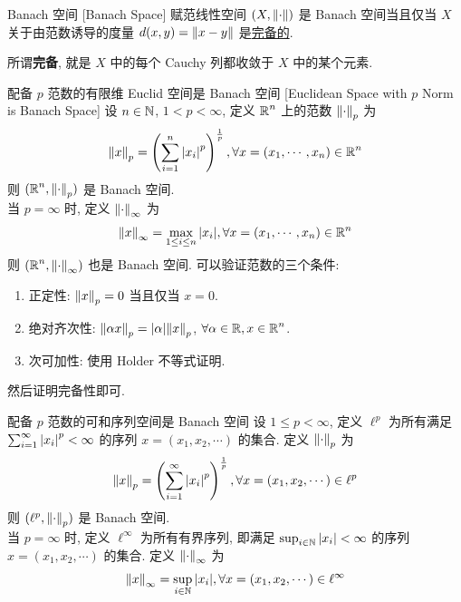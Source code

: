         \begin{dfn}
            [bs]
            {Banach 空间}
            [Banach Space]
            赋范线性空间 \((X, \norm{\cdot})\) 是 Banach 空间当且仅当 \(X\) 关于由范数诱导的度量 \(d(x,y)=\norm{x-y}\) 是\hyperref[dfn:complete]{完备的}.
        \end{dfn}

        \begin{rmk}
            [Dedicatia]
            所谓\textbf{完备}, 就是 \(X\) 中的每个 Cauchy 列都收敛于 \(X\) 中的某个元素.
        \end{rmk}

        \begin{ins}
            [euclid]
            {配备 \(p\) 范数的有限维 Euclid 空间是 Banach 空间}
            [Euclidean Space with \(p\) Norm is Banach Space]
            设 \(n\in\operatorname{\mathbb{N}}\), \(1<p<\infty\), 定义 \(\operatorname{\mathbb{R}}^n\) 上的范数 \(\norm{\cdot}_p\) 为
            \[\norm{x}_p=\left(\sum_{i=1}^n\abs{x_i}^p\right)^{\frac{1}{p}}, \forall x=(x_1,\cdots,x_n)\in\operatorname{\mathbb{R}}^n\]
            则 \((\operatorname{\mathbb{R}}^n, \norm{\cdot}_p)\) 是 Banach 空间.\\
            当 \(p=\infty\) 时, 定义 \(\norm{\cdot}_\infty\) 为
            \[\norm{x}_\infty=\max_{1\leq i\leq n}\abs{x_i}, \forall x=(x_1,\cdots,x_n)\in\operatorname{\mathbb{R}}^n\]
            则 \((\operatorname{\mathbb{R}}^n, \norm{\cdot}_\infty)\) 也是 Banach 空间.
            \tcbline
            可以验证范数的三个条件:
            \begin{enumerate}[label=(\roman*)]
                \item 正定性: \(\norm{x}_p=0\) 当且仅当 \(x=0\). 
                \item 绝对齐次性: \(\norm{\alpha x}_p=\abs{\alpha}\norm{x}_p\), \(\forall \alpha\in\operatorname{\mathbb{R}}, x\in\operatorname{\mathbb{R}}^n\). 
                \item 次可加性: 使用 Holder 不等式证明.
            \end{enumerate}
            然后证明完备性即可.
        \end{ins}

        \begin{ins}
            {配备 \(p\) 范数的可和序列空间是 Banach 空间}
            设 \(1\leq p<\infty\), 定义 \(\ell^p\) 为所有满足 \(\sum_{i=1}^\infty\abs{x_i}^p<\infty\) 的序列 \(x=(x_1,x_2,\cdots)\) 的集合. 定义 \(\norm{\cdot}_p\) 为
            \[\norm{x}_p=\left(\sum_{i=1}^\infty\abs{x_i}^p\right)^{\frac{1}{p}}, \forall x=(x_1,x_2,\cdots)\in\ell^p\]
            则 \((\ell^p, \norm{\cdot}_p)\) 是 Banach 空间.\\
            当 \(p=\infty\) 时, 定义 \(\ell^\infty\) 为所有有界序列, 即满足 \(\sup_{i\in\operatorname{\mathbb{N}}}\abs{x_i}<\infty\) 的序列 \(x=(x_1,x_2,\cdots)\) 的集合. 定义 \(\norm{\cdot}_\infty\) 为
            \[\norm{x}_\infty=\sup_{i\in\operatorname{\mathbb{N}}}\abs{x_i}, \forall x=(x_1,x_2,\cdots)\in\ell^\infty\]
        \end{ins}

